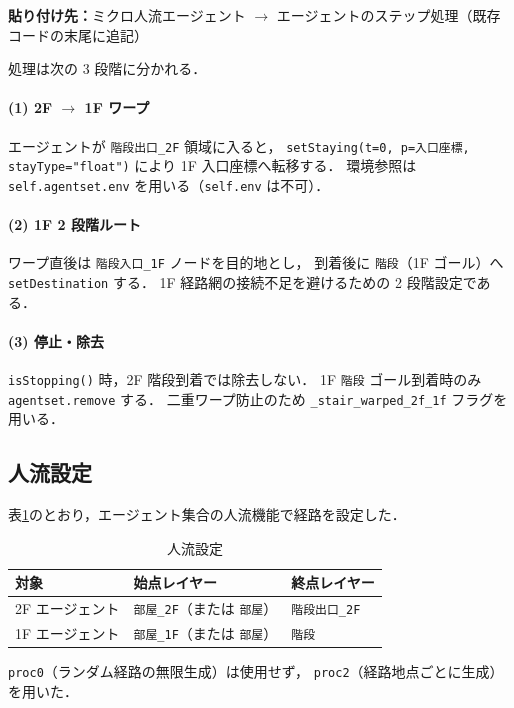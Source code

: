 \documentclass[11pt,a4paper]{ltjsarticle}
\begin{document}
\textbf{貼り付け先：}ミクロ人流エージェント $\rightarrow$ エージェントのステップ処理（既存コードの末尾に追記）

処理は次の 3 段階に分かれる．

\paragraph{(1) 2F $\rightarrow$ 1F ワープ}
エージェントが \texttt{階段出口\_2F} 領域に入ると，
\texttt{setStaying(t=0, p=入口座標, stayType="float")} により 1F 入口座標へ転移する．
環境参照は \texttt{self.agentset.env} を用いる（\texttt{self.env} は不可）．

\paragraph{(2) 1F 2 段階ルート}
ワープ直後は \texttt{階段入口\_1F} ノードを目的地とし，
到着後に \texttt{階段}（1F ゴール）へ \texttt{setDestination} する．
1F 経路網の接続不足を避けるための 2 段階設定である．

\paragraph{(3) 停止・除去}
\texttt{isStopping()} 時，2F 階段到着では除去しない．
1F \texttt{階段} ゴール到着時のみ \texttt{agentset.remove} する．
二重ワープ防止のため \texttt{\_stair\_warped\_2f\_1f} フラグを用いる．

\subsection{人流設定}

表\ref{tab:peopleflow}のとおり，エージェント集合の人流機能で経路を設定した．

\begin{table}[H]
  \centering
  \caption{人流設定}
  \label{tab:peopleflow}
  \begin{tabular}{lll}
    \toprule
    対象 & 始点レイヤー & 終点レイヤー \\
    \midrule
    2F エージェント & \texttt{部屋\_2F}（または \texttt{部屋}） & \texttt{階段出口\_2F} \\
    1F エージェント & \texttt{部屋\_1F}（または \texttt{部屋}） & \texttt{階段} \\
    \bottomrule
  \end{tabular}
\end{table}

\texttt{proc0}（ランダム経路の無限生成）は使用せず，
\texttt{proc2}（経路地点ごとに生成）を用いた．
\end{document}
